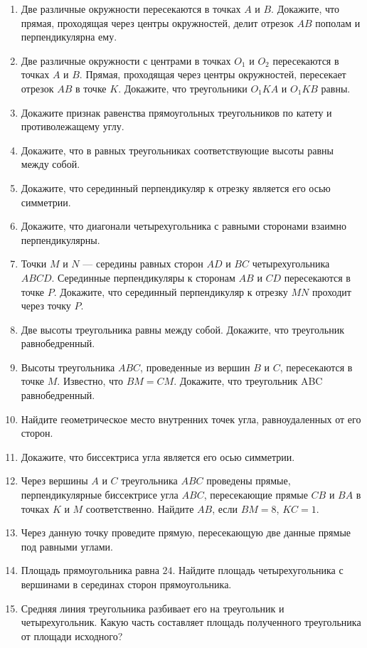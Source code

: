 \documentclass[10pt, a4paper]{article}
\begin{document}
\begin{enumerate}
		\item Две различные окружности пересекаются в точках $A$ и $B$. Докажите, что прямая, проходящая через центры окружностей, делит отрезок $AB$ пополам и перпендикулярна ему.
		\item Две различные окружности с центрами в точках $O_1$ и $O_2$ пересекаются в точках $A$ и $B$. Прямая, проходящая через центры окружностей, пересекает отрезок $AB$ в точке $K$. Докажите, что треугольники $O_1KA$ и $O_1KB$ равны.
		\item Докажите признак равенства прямоугольных треугольников по катету и противолежащему углу.
		\item Докажите, что в равных треугольниках соответствующие высоты равны между собой.
		\item Докажите, что серединный перпендикуляр к отрезку является его осью симметрии.
		\item Докажите, что диагонали четырехугольника с равными сторонами взаимно перпендикулярны.
		\item Точки $M$ и $N$ --- середины равных сторон $AD$ и $BC$ четырехугольника $ABCD$. Серединные перпендикуляры к сторонам $AB$ и $CD$ пересекаются в точке $P$. Докажите, что серединный перпендикуляр к отрезку $MN$ проходит через точку $P$.
		\item Две высоты треугольника равны между собой. Докажите, что треугольник равнобедренный.
		\item Высоты треугольника $ABC$, проведенные из вершин $B$ и $C$, пересекаются в точке $M$. Известно, что $BM = CM$. Докажите, что треугольник ABC равнобедренный.
		\item Найдите геометрическое место внутренних точек угла, равноудаленных от его сторон.
		\item Докажите, что биссектриса угла является его осью симметрии.
		\item Через вершины $A$ и $C$ треугольника $ABC$ проведены прямые, перпендикулярные биссектрисе угла $ABC$, пересекающие прямые $CB$ и $BA$ в точках $K$ и $M$ соответственно. Найдите $AB$, если $BM = 8$, $KC = 1$.
		\item Через данную точку проведите прямую, пересекающую две данные прямые под равными углами.
		\item Площадь прямоугольника равна $24$. Найдите площадь четырехугольника с вершинами в серединах сторон прямоугольника.
		\item Средняя линия треугольника разбивает его на треугольник и четырехугольник. Какую часть составляет площадь полученного треугольника от площади исходного?

\end{enumerate}
\end{document}
